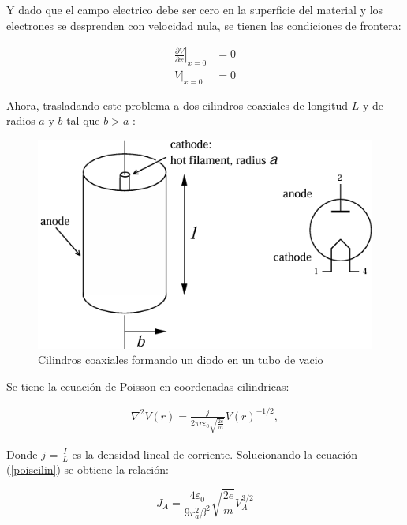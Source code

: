 \documentclass[%
 reprint,
 amsmath,amssymb,
 aps,
]{revtex4-2}
\begin{document}
\vspace{0.2 cm}
Y dado que el campo electrico debe ser cero en la superficie del material y los electrones se desprenden con velocidad nula, se tienen las condiciones de frontera:

\begin{align*}
    \left. \frac{\partial V}{\partial x}\right|_{x=0}&=0\\
        \left. V\right|_{x=0}&=0
\end{align*}

\vspace{0.2 cm}
Ahora, trasladando este problema a dos cilindros coaxiales de longitud $L$ y de radios $a$ y $b$ tal que $b>a$ :

\begin{figure}[H]
    \centering
    \includegraphics[width=0.8\linewidth]{../src/imagenes/Cilindros.png}
    \caption{Cilindros coaxiales formando un diodo en un tubo de vacio}
    \label{fig:2}
\end{figure}

\vspace{0.2 cm}
Se tiene la ecuación de Poisson en coordenadas cilindricas:

\begin{align}
    \label{poiscilin}
    \nabla^{2}V(r) = \frac{j}{2\pi r \varepsilon_{0}\sqrt{\frac{2e}{m}}} V(r)^{-1/2},
\end{align}

\vspace{0.2 cm}
Donde $j$ = $\frac{I}{L}$ es la densidad lineal de corriente. Solucionando la ecuación (\ref{poiscilin}) se obtiene la relación:

\begin{equation}
    J_{A}= \frac{4\varepsilon_{0}}{9r_{a}^{2}\beta^{2}}\sqrt{\frac{2e}{m}}V_{A}^{3/2}
    \label{eq: Ley de Child cilindrica}
\end{equation}
\end{document}
